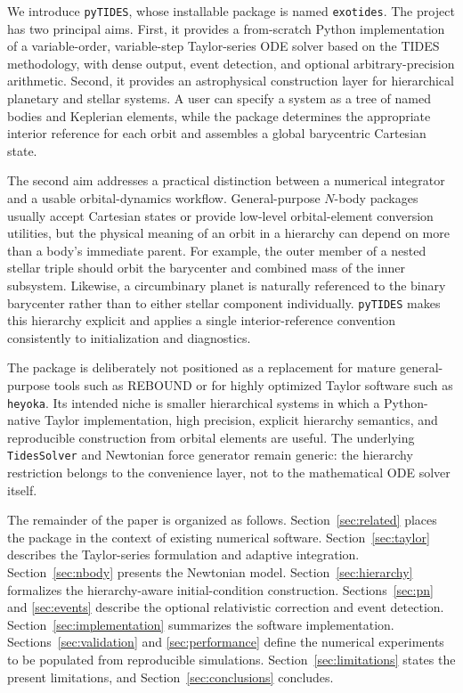 \documentclass[11pt]{article}
\begin{document}
We introduce \texttt{pyTIDES}, whose installable package is named
\texttt{exotides}. The project has two principal aims. First, it provides a
from-scratch Python implementation of a variable-order, variable-step
Taylor-series ODE solver based on the TIDES methodology, with dense output,
event detection, and optional arbitrary-precision arithmetic. Second, it
provides an astrophysical construction layer for hierarchical planetary and
stellar systems. A user can specify a system as a tree of named bodies and
Keplerian elements, while the package determines the appropriate interior
reference for each orbit and assembles a global barycentric Cartesian state.

The second aim addresses a practical distinction between a numerical
integrator and a usable orbital-dynamics workflow. General-purpose $N$-body
packages usually accept Cartesian states or provide low-level orbital-element
conversion utilities, but the physical meaning of an orbit in a hierarchy can
depend on more than a body's immediate parent. For example, the outer member
of a nested stellar triple should orbit the barycenter and combined mass of
the inner subsystem. Likewise, a circumbinary planet is naturally referenced
to the binary barycenter rather than to either stellar component
individually. \texttt{pyTIDES} makes this hierarchy explicit and applies a
single interior-reference convention consistently to initialization and
diagnostics.

The package is deliberately not positioned as a replacement for mature
general-purpose tools such as REBOUND or for highly optimized Taylor software
such as \texttt{heyoka}. Its intended niche is smaller hierarchical systems
in which a Python-native Taylor implementation, high precision, explicit
hierarchy semantics, and reproducible construction from orbital elements are
useful. The underlying \texttt{TidesSolver} and Newtonian force generator
remain generic: the hierarchy restriction belongs to the convenience layer,
not to the mathematical ODE solver itself.

The remainder of the paper is organized as follows.
Section~\ref{sec:related} places the package in the context of existing
numerical software. Section~\ref{sec:taylor} describes the Taylor-series
formulation and adaptive integration. Section~\ref{sec:nbody} presents the
Newtonian model. Section~\ref{sec:hierarchy} formalizes the hierarchy-aware
initial-condition construction. Sections~\ref{sec:pn} and
\ref{sec:events} describe the optional relativistic correction and event
detection. Section~\ref{sec:implementation} summarizes the software
implementation. Sections~\ref{sec:validation} and \ref{sec:performance}
define the numerical experiments to be populated from reproducible
simulations. Section~\ref{sec:limitations} states the present limitations,
and Section~\ref{sec:conclusions} concludes.
\end{document}
